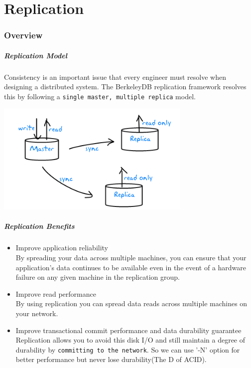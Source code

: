 \documentclass{beamer}
\newcommand{\mypart}[1]{\part{#1}\frame{\partpage \tableofcontents}}
\newcommand{\mysection}[1]{\section{#1}\frame{\frametitle{#1}\tableofcontents[sectionstyle=show/shaded,subsectionstyle=show/shaded/shaded]}}
\begin{document}
\mypart{Replication}
\mysection{Overview}
\begin{frame}
\frametitle{Replication Model}
Consistency is an important issue that every engineer must resolve when designing a distributed system. The BerkeleyDB replication framework resolves this by following a \texttt{single master, multiple replica} model. 
\begin{center}
\includegraphics[scale=1,width=0.70\textwidth]{replication.png}
\end{center}
\end{frame}

\begin{frame}
\frametitle{Replication Benefits}
\begin{itemize}
\item Improve application reliability \\
By spreading your data across multiple machines, you can ensure that your application's data continues to be available even in the event of a hardware failure on any given machine in the replication group.  
\item Improve read performance \\
By using replication you can spread data reads across multiple machines on your network. 
\item Improve transactional commit performance and data durability guarantee\\
Replication allows you to avoid this disk I/O and still maintain a degree of durability by \texttt{committing to the network}. So we can use '-N' option for better performance but never lose durability(The D of ACID).
\end{itemize}
\end{frame}
\end{document}
